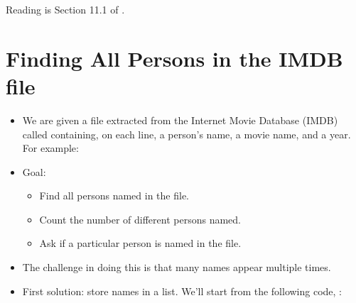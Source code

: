 \documentclass[letterpaper,10pt,english]{sphinxmanual}
\begin{document}
Reading is Section 11.1 of .


\section{Finding All Persons in the IMDB file}
\label{\detokenize{lecture_notes/lec15_sets:finding-all-persons-in-the-imdb-file}}\begin{itemize}
\item {} 
We are given a file extracted from the Internet Movie Database (IMDB)
called  containing, on each line, a person’s name, a
movie name, and a year. For example:

\begin{sphinxVerbatim}[commandchars=\\\{\}]
           
\end{sphinxVerbatim}

\item {} 
Goal:
\begin{itemize}
\item {} 
Find all persons named in the file.

\item {} 
Count the number of different persons named.

\item {} 
Ask if a particular person is named in the file.

\end{itemize}

\item {} 
The challenge in doing this is that many names appear multiple times.

\item {} 
First solution: store names in a list. We’ll start from the
following code,
:

\begin{sphinxVerbatim}[commandchars=\\\{\}]
  
  \PYG{p}{[}\PYG{p}{]}
    
      
      \PYG{p}{[}\PYG{p}{]}
\end{sphinxVerbatim}


\end{itemize}
\end{document}
